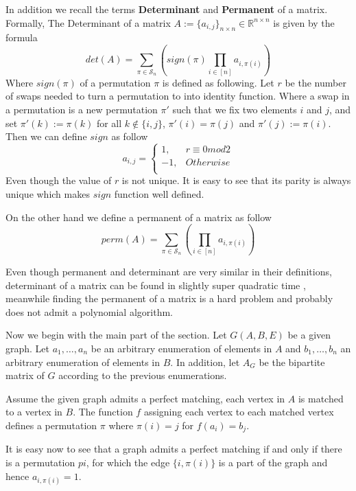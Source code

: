 In addition we recall the terms \textbf{Determinant} and \textbf{Permanent} of a matrix.
Formally, The Determinant of a matrix $A := \{a_{i, j}\}_{n \times n} \in \mathbb{R}^{n \times n}$ is given by the formula
\[
	det(A) = \sum\limits_{\pi \in \mathcal{S}_n} \left( sign(\pi) \prod\limits_{i \in [n]} a_{i, \pi(i)}  \right)
\]
Where $sign(\pi)$ of a permutation $\pi$ is defined as following.
Let $r$ be the number of swaps needed to turn a permutation to into identity function. Where a swap in a permutation is a new permutation $\pi'$ such that we fix two elements $i$ and $j$, and set $\pi'(k) := \pi(k)$ for all $k \notin \{i, j\}$, $\pi'(i) = \pi(j)$ and $\pi'(j) := \pi(i)$.
Then we can define $sign$ as follow
	\begin{equation*}
		a_{i,j} =
		\begin{cases}
			1, & r \equiv 0 mod 2\\
			-1, & Otherwise\\
		\end{cases}
	\end{equation*}
Even though the value of $r$ is not unique. It is easy to see that its parity is always unique which makes $sign$ function well defined.

On the other hand we define a permanent of a matrix as follow
\[
	perm(A) = \sum\limits_{\pi \in \mathcal{S}_n} \left( \prod\limits_{i \in [n]} a_{i, \pi(i)}  \right)
\]

Even though permanent and determinant are very similar in their definitions, determinant of a matrix can be found in slightly super quadratic time \cite{aho1974design}, meanwhile finding the permanent of a matrix is a hard problem \cite{valiant1979complexity} and probably does not admit a polynomial algorithm.

Now we begin with the main part of the section. Let $G(A, B, E)$ be a given graph. Let $a_1, \dots, a_n$ be an arbitrary enumeration of elements in $A$ and $b_1, \dots, b_n$ an arbitrary enumeration of elements in $B$. In addition, let $A_G$ be the bipartite matrix of $G$ according to the previous enumerations. 

Assume the given graph admits a perfect matching, each vertex in $A$ is matched to a vertex in $B$. The function $f$ assigning each vertex to each matched vertex defines a permutation $\pi$ where $\pi(i) = j$ for $f(a_i) = b_j$.

It is easy now to see that a graph admits a perfect matching if and only if there is a permutation $pi$, for which the edge $\{i, \pi(i)\}$ is a part of the graph and hence $a_{i, \pi(i)} = 1$.

